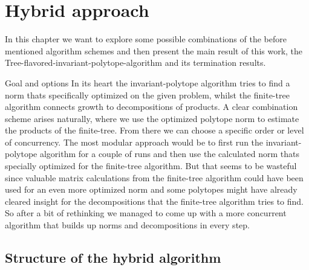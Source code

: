 
\chapter{Hybrid approach} 
\label{ch:hybrid}

In this chapter we want to explore some possible combinations of the before mentioned algorithm schemes and then present the main result of this work, the Tree-flavored-invariant-polytope-algorithm and its termination results. 

\begin{section}{Goal and options}
In its heart the invariant-polytope algorithm tries to find a norm thats specifically optimized on the given problem, whilst the finite-tree algorithm connects growth to decompositions of products. A clear combination scheme arises naturally, where we use the optimized polytope norm to estimate the products of the finite-tree. From there we can choose a specific order or level of concurrency.
\newline
The most modular approach would be to first run the invariant-polytope algorithm for a couple of runs and then use the calculated norm thats specially optimized for the finite-tree algorithm. But that seems to be wasteful since valuable matrix calculations from the finite-tree algorithm could have been used for an even more optimized norm and some polytopes might have already cleared insight for the decompositions that the finite-tree algorithm tries to find. So after a bit of rethinking we managed to come up with a more concurrent algorithm that builds up norms and decompositions in every step. 
\end{section}

\section{Structure of the hybrid algorithm}

